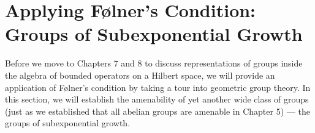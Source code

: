 \section{Applying Følner's Condition: Groups of Subexponential Growth}%
Before we move to Chapters 7 and 8 to discuss representations of groups inside the algebra of bounded operators on a Hilbert space, we will provide an application of Følner's condition by taking a tour into geometric group theory. In this section, we will establish the amenability of yet another wide class of groups (just as we established that all abelian groups are amenable in Chapter 5) --- the groups of subexponential growth.\newline

